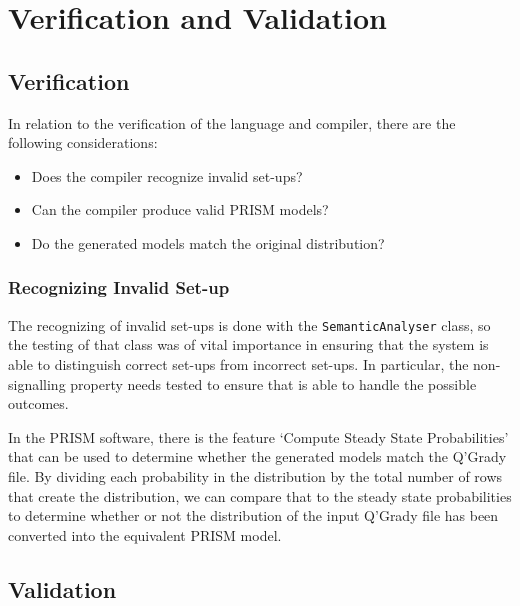 \documentclass[report.tex]{subfiles}
\begin{document}
\chapter{Verification and Validation} %
\label{cha:verification_and_validation}
\section{Verification} %
\label{sec:verification}
In relation to the verification of the language and compiler, there are the
following considerations:
\begin{itemize}
    \item Does the compiler recognize invalid set-ups?
    \item Can the compiler produce valid PRISM models?
    \item Do the generated models match the original distribution?
\end{itemize}

\subsection{Recognizing Invalid Set-up} %
\label{sub:recognizing_invalid_set_up}
The recognizing of invalid set-ups is done with the \texttt{SemanticAnalyser}
class, so the testing of that class was of vital importance in ensuring that
the system is able to distinguish correct set-ups from incorrect set-ups. In
particular, the non-signalling property needs tested to ensure that is able to
handle the possible outcomes.

In the PRISM software, there is the feature `Compute Steady State Probabilities'
that can be used to determine whether the generated models match the Q'Grady
file. By dividing each probability in the distribution by the total number of
rows that create the distribution, we can compare that to the steady state
probabilities to determine whether or not the distribution of the input Q'Grady
file has been converted into the equivalent PRISM model.

\section{Validation} %
\label{sec:validation}

\newpage
\end{document}
